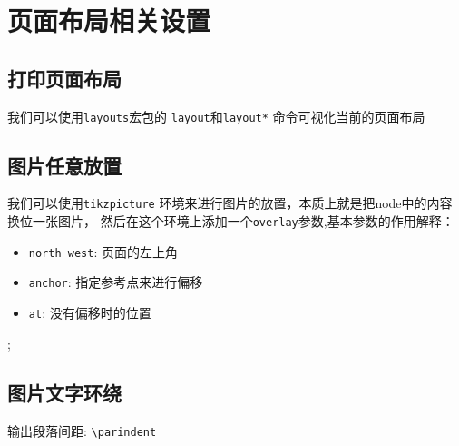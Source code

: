 \documentclass[fontset=windows, 12pt]{article}
\begin{document}
\newpage
\section{页面布局相关设置}

\subsection{打印页面布局}
我们可以使用\texttt{layouts}宏包的 \texttt{layout}和\texttt{layout*} 命令可视化当前的页面布局

\bigskip
\begin{center}
\layout
\end{center}
\newpage

\subsection{图片任意放置}

我们可以使用\texttt{tikzpicture} 环境来进行图片的放置，本质上就是把node中的内容换位一张图片，
然后在这个环境上添加一个\texttt{overlay}参数,基本参数的作用解释：
\begin{itemize}
    \item \texttt{north west}: 页面的左上角
    \item \texttt{anchor}: 指定参考点来进行偏移
    \item \texttt{at}: 没有偏移时的位置
\end{itemize}






;


\newpage
\subsection{图片文字环绕}
输出段落间距: \verb |\parindent |
\end{document}
